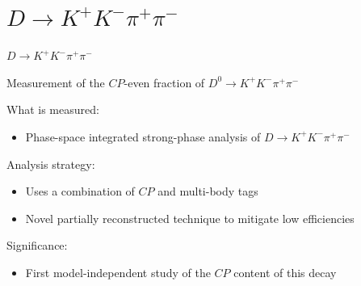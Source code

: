 \documentclass{beamer}
\begin{document}
\section{\texorpdfstring{$D\to K^+K^-\pi^+\pi^-$}{D2KKpipi}}
\begin{frame}{$D\to K^+K^-\pi^+\pi^-$}
\begin{tcolorbox}[enhanced,frame style image=blueshade_cropped.png,
  opacityback=0.75,opacitybacktitle=0.25,
  colback=blue!5!white,colframe=blue!75!black,
  title=\color{white}{\href{https://journals.aps.org/prd/abstract/10.1103/PhysRevD.107.032009}{\color{white}{Phys. Rev. D \textbf{107} 032009}}}]
  {\Large Measurement of the $C\!P$-even fraction of $D^0\to K^+K^-\pi^+\pi^-$}
\end{tcolorbox}
  What is measured:
  \begin{itemize}
    \item{Phase-space integrated strong-phase analysis of $D\to K^+K^-\pi^+\pi^-$}
  \end{itemize}
  Analysis strategy:
  \begin{itemize}
    \item{Uses a combination of $C\!P$ and multi-body tags}
    \item{Novel partially reconstructed technique to mitigate low efficiencies}
  \end{itemize}
  Significance:
  \begin{itemize}
    \item{First model-independent study of the $C\!P$ content of this decay}
  \end{itemize}
\end{frame}
\end{document}
